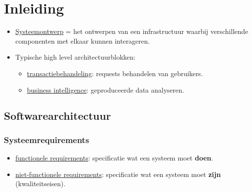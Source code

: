 \documentclass{report}
\begin{document}
	\tableofcontents
	\chapter{Inleiding}
	\begin{itemize}
		\item[\info] \underline{Systeemontwerp} = het ontwerpen van een infrastructuur waarbij verschillende componenten met elkaar kunnen interageren.
		\item[\info] Typische high level architectuurblokken: 
			\begin{itemize}
				\item[\info] \underline{transactiebehandeling}: requests behandelen van gebruikers.
				\item[\info] \underline{business intelligence}: geproduceerde data analyseren.
			\end{itemize}  
	\end{itemize}
	\section{Softwarearchitectuur}
	\subsection{Systeemrequirements}
	\begin{itemize}
		\item[\info] \underline{functionele requirements}: specificatie wat een systeem moet \textbf{doen}.
		\item[\info] \underline{niet-functionele requirements}: specificatie wat een systeem moet \textbf{zijn} (kwaliteitseisen).
	\end{itemize}
\end{document}
